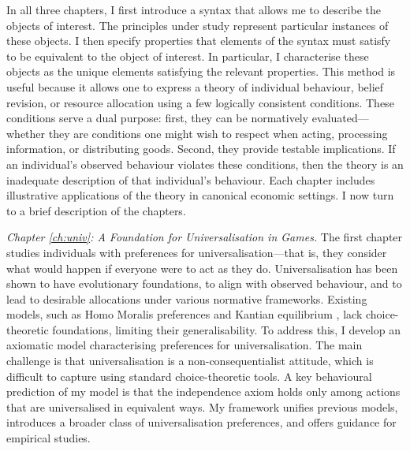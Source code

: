 In all three chapters, I first introduce a syntax that allows me to describe the objects of interest. The principles under study represent particular instances of these objects. I then specify properties that elements of the syntax must satisfy to be equivalent to the object of interest. In particular, I characterise these objects as the unique elements satisfying the relevant properties. This method is useful because it allows one to express a theory of individual behaviour, belief revision, or resource allocation using a few logically consistent conditions. These conditions serve a dual purpose: first, they can be normatively evaluated—whether they are conditions one might wish to respect when acting, processing information, or distributing goods. Second, they provide testable implications. If an individual’s observed behaviour violates these conditions, then the theory is an inadequate description of that individual’s behaviour. Each chapter includes illustrative applications of the theory in canonical economic settings. I now turn to a brief description of the chapters.

\emph{Chapter \ref{ch:univ}: A Foundation for Universalisation in Games.} The first chapter studies individuals with preferences for universalisation—that is, they consider what would happen if everyone were to act as they do. Universalisation has been shown to have evolutionary foundations, to align with observed behaviour, and to lead to desirable allocations under various normative frameworks. Existing models, such as Homo Moralis preferences \citep{algerHomoMoralisPreference2013} and Kantian equilibrium \citep{roemer2019cooperate}, lack choice-theoretic foundations, limiting their generalisability. To address this, I develop an axiomatic model characterising preferences for universalisation. The main challenge is that universalisation is a non-consequentialist attitude, which is difficult to capture using standard choice-theoretic tools. A key behavioural prediction of my model is that the independence axiom holds only among actions that are universalised in equivalent ways. My framework unifies previous models, introduces a broader class of universalisation preferences, and offers guidance for empirical studies.

